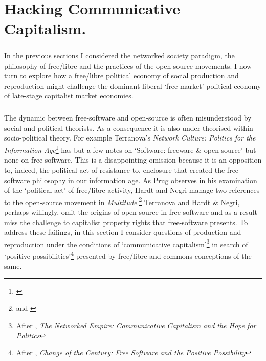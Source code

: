 \newpage
\chapter{Hacking Communicative Capitalism.}
\paragraph{}In the previous sections I considered the networked society paradigm, the philosophy of free/libre and the practices of the open-source movements. I now turn to explore how a free/libre political economy of social production and reproduction might challenge the dominant liberal `free-market' political economy of late-stage capitalist market economies.

\paragraph{}The dynamic between free-software and open-source is often misunderstood by social and political theorists. As a consequence it is also under-theorised within socio-political theory. For example Terranova's \textit{Network Culture: Politics for the Information Age}\footnote{\cite{Terranova:2004ly}} has but a few notes on  `Software: freeware \& open-source' but none on free-software. This is a disappointing omission because it is an opposition to, indeed, the political act of resistance to, enclosure that created the free-software philosophy in our information age. As Prug observes in his examination of the `political act' of free/libre activity, Hardt and Negri manage two references to the open-source movement in \textit{Multitude}.\footnote{\cite[`Hackers and the Protestant ethics']{Prug:2007fs} and \cite[p. 301 \& pp. 339-40]{Hardt:2005zt}} Terranova and Hardt \& Negri, perhaps willingly, omit the origins of open-source in free-software and as a result miss the challenge to capitalist property rights that free-software presents. To address these failings, in this section I consider questions of production and reproduction under the conditions of `communicative capitalism'\footnote{After \cite{dean:2005cc}, \textit{The Networked Empire: Communicative Capitalism and the Hope for Politics}} in search of `positive possibilities'\footnote{After \cite{Hardie:2005px}, \textit{Change of the Century: Free Software and the Positive Possibility}} presented by free/libre and commons conceptions of the same.

